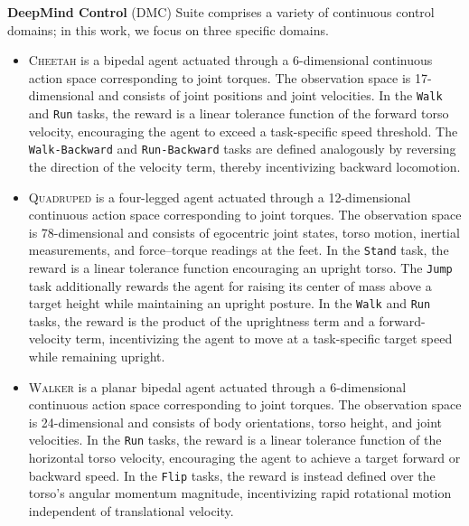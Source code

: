 \documentclass{article}
\theoremstyle{plain}
\theoremstyle{definition}
\theoremstyle{remark}
\begin{document}
\textbf{DeepMind Control} (DMC) Suite \citep{tassa2018deepmind} comprises a variety of continuous control domains; in this work, we focus on three specific domains.

\begin{itemize}

    \item \textsc{Cheetah} is a bipedal agent actuated through a 6-dimensional continuous action space corresponding to joint torques. The observation space is 17-dimensional and consists of joint positions and joint velocities. In the \texttt{Walk} and \texttt{Run} tasks, the reward is a linear tolerance function of the forward torso velocity, encouraging the agent to exceed a task-specific speed threshold. The \texttt{Walk-Backward} and \texttt{Run-Backward} tasks are defined analogously by reversing the direction of the velocity term, thereby incentivizing backward locomotion.

    \item \textsc{Quadruped} is a four-legged agent actuated through a 12-dimensional continuous action space corresponding to joint torques. The observation space is 78-dimensional and consists of egocentric joint states, torso motion, inertial measurements, and force--torque readings at the feet. In the \texttt{Stand} task, the reward is a linear tolerance function encouraging an upright torso. The \texttt{Jump} task additionally rewards the agent for raising its center of mass above a target height while maintaining an upright posture. In the \texttt{Walk} and \texttt{Run} tasks, the reward is the product of the uprightness term and a forward-velocity term, incentivizing the agent to move at a task-specific target speed while remaining upright.

    \item \textsc{Walker} is a planar bipedal agent actuated through a 6-dimensional continuous action space corresponding to joint torques. The observation space is 24-dimensional and consists of body orientations, torso height, and joint velocities. In the \texttt{Run} tasks, the reward is a linear tolerance function of the horizontal torso velocity, encouraging the agent to achieve a target forward or backward speed. In the \texttt{Flip} tasks, the reward is instead defined over the torso’s angular momentum magnitude, incentivizing rapid rotational motion independent of translational velocity.




\end{itemize}
\end{document}
